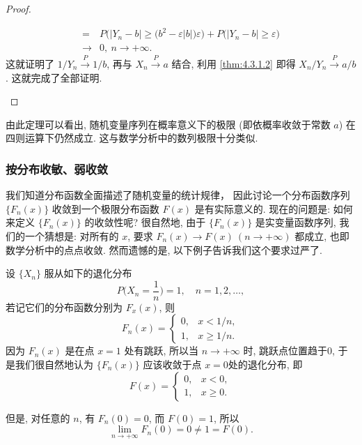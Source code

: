 \begin{proof}
\begin{enumerate}
\begin{align*}
            ={} & P \bigl( \bigl\lvert Y_n - b \bigr\rvert \geq \bigl( b^2 - \varepsilon \lvert b \rvert \bigr) \varepsilon \bigr)
            + P \bigl( \bigl\lvert Y_n - b \bigr\rvert \geq \varepsilon \bigr)\\
            \to {} & 0, \ n \to +\infty.
        \end{align*}
        这就证明了 $ 1 / Y_n \stackrel{P}{\to} 1 / b $, 再与 $ X_n \stackrel{P}{\to} a $ 结合, 利用 \ref{thm:4.3.1.2} 即得 $ X_n / Y_n \stackrel{P}{\to} a / b $.
        这就完成了全部证明.
    \end{enumerate}
\end{proof}

由此定理可以看出, 随机变量序列在概率意义下的极限 (即依概率收敛于常数 $ a $) 在四则运算下仍然成立.
这与数学分析中的数列极限十分类似.

\subsubsection{按分布收敏、弱收敛}

我们知道分布函数全面描述了随机变量的统计规律， 因此讨论一个分布函数序列 $ \{ F_n (x) \} $ 收敛到一个极限分布函数 $ F (x) $ 是有实际意义的.
现在的问题是: 如何来定义 $ \{ F_n (x) \} $ 的收敛性呢?
很自然地, 由于 $ \{ F_n (x) \} $ 是实变量函数序列, 我们的一个猜想是: 对所有的 $ x $, 要求 $ F_n (x) \to F (x) \ ( n \to +\infty ) $ 都成立, 也即数学分析中的点点收敛.
然而遗憾的是, 以下例子告诉我们这个要求过严了.

\begin{example}\label{exam:4.3.1}
    设 $ \{ X_n \} $ 服从如下的退化分布
    \begin{equation*}
        P \biggl( X_n = \frac{1}{n} \biggr) = 1, \quad n = 1, 2, \dotsc,
    \end{equation*}
    若记它们的分布函数分别为 $ F_x (x) $, 则
    \begin{equation*}
        F_n ( x ) =
        \begin{cases}
            0, & x < 1/n,\\
            1, & x \geq 1/n.
        \end{cases}
    \end{equation*}
    因为 $ F_n (x) $ 是在点 $ x=1 $ 处有跳跃, 所以当 $ n \to +\infty $ 时, 跳跃点位置趋于0, 于是我们很自然地认为 $ \{ F_n (x) \} $ 应该收敛于点 $ x=0 $处的退化分布, 即
    \begin{equation*}
        F (x) =
        \begin{cases}
            0, & x < 0,\\
            1, & x \geq 0.
        \end{cases}
    \end{equation*}

    但是, 对任意的 $ n $, 有 $ F_n (0) = 0 $, 而 $ F (0) = 1 $, 所以
    \begin{equation*}
        \lim_{n \to +\infty} F_n (0) = 0 \neq 1 = F (0).
    \end{equation*}
\end{example}

